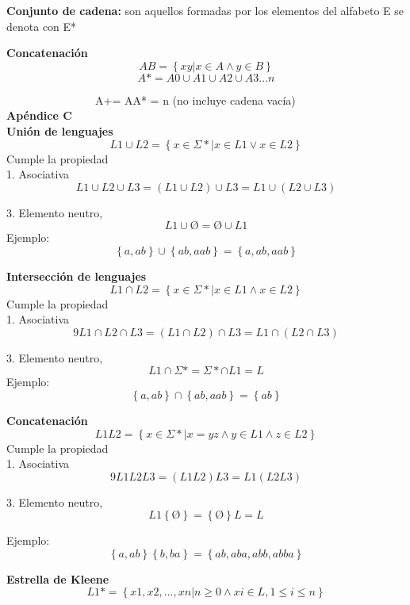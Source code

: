 \documentclass{llncs}
\begin{document}
\textbf{Conjunto de cadena:} son aquellos formadas por los elementos del alfabeto E  se denota con E*

\textbf{Concatenación}
\[
AB=
\left\lbrace
xy | x \in A \wedge y \in B
\right\rbrace
\]
\[
A*= A0 \cup A1 \cup A2 \cup A3 ... n
\]

\  \  \  \  \  \  \  \  \  \  \  \  \  \  \  \  A+= AA* = n  (no incluye cadena vacía) \\
\textbf{Apéndice C} \\
\textbf{Unión de lenguajes}
\[
L1 \cup L2=
\left\lbrace
x \in \Sigma * |x \in L1 \vee x \in L2
\right\rbrace
\]
Cumple la propiedad \\
1. Asociativa 
 \[
 L1 \cup L2 \cup L3 = (L1 \cup L2 ) \cup L3 = L1 \cup (L2 \cup L3)  
  \]

3. Elemento neutro, 
 \[
 L1 \cup  Ø  =  Ø  \cup L1 
  \]
 Ejemplo:
 \[
\left\lbrace 
a, ab \right\rbrace \cup \left\lbrace 
ab, aab \right\rbrace = \left\lbrace 
a, ab, aab \right\rbrace
\]

\textbf{Intersección de lenguajes}
\[
L1 \cap L2=
\left\lbrace
x \in \Sigma * |x \in L1 \wedge x \in L2
\right\rbrace
\]
Cumple la propiedad \\
1. Asociativa
 \[9
    L1 \cap L2 \cap L3 = (L1 \cap L2) \cap L3 = L1 \cap (L2 \cap L3)
  \]

3. Elemento neutro, 
 \[
 L1 \cap  \Sigma *  =  \Sigma * \cap L1 = L 
  \]
 Ejemplo:
 \[
\left\lbrace 
a, ab \right\rbrace \cap \left\lbrace 
ab, aab \right\rbrace = \left\lbrace 
 ab \right\rbrace
\]



\textbf{Concatenación }
\[
L1L2=
\left\lbrace
x \in \Sigma * |x = yz \wedge y \in L1 \wedge z \in L2
\right\rbrace
\]
Cumple la propiedad \\
1. Asociativa
 \[9
    L1L2L3 = (L1L2)L3 = L1(L2L3)
  \]

3. Elemento neutro, 
 \[
 L1 \left\lbrace Ø \right\rbrace =  \left\lbrace Ø \right\rbrace L = L
  \]
 
 Ejemplo:
 \[
\left\lbrace 
a, ab \right\rbrace \left\lbrace 
b, ba \right\rbrace = \left\lbrace 
 ab, aba, abb, abba \right\rbrace
\]

\textbf{Estrella de Kleene}
 \[
 L1* = \left\lbrace x1,x2,...,xn | n\geq 0 \wedge xi \in L, 1 \leq i \leq n \right\rbrace 
  \]
\end{document}
